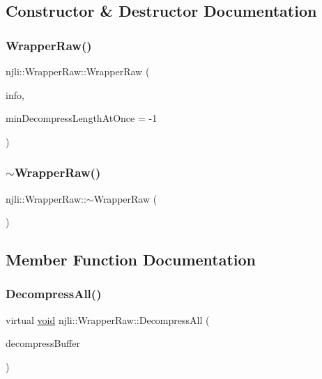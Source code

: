 \subsection{Constructor \& Destructor Documentation}
\mbox{\label{classnjli_1_1_wrapper_raw_ad512917755c10182cb00cb0f398e58ff}} 
\subsubsection{\texorpdfstring{Wrapper\+Raw()}{WrapperRaw()}}
{\footnotesize\ttfamily njli\+::\+Wrapper\+Raw\+::\+Wrapper\+Raw (\begin{DoxyParamCaption}\item[{Sound\+Info}]{info,  }\item[{int}]{min\+Decompress\+Length\+At\+Once = {\ttfamily -\/1} }\end{DoxyParamCaption})}

\mbox{\label{classnjli_1_1_wrapper_raw_a495e13205f68e27f66c6bcc3ff3ec0b2}} 
\subsubsection{\texorpdfstring{$\sim$\+Wrapper\+Raw()}{~WrapperRaw()}}
{\footnotesize\ttfamily njli\+::\+Wrapper\+Raw\+::$\sim$\+Wrapper\+Raw (\begin{DoxyParamCaption}{ }\end{DoxyParamCaption})}



\subsection{Member Function Documentation}
\mbox{\label{classnjli_1_1_wrapper_raw_aa3e0d88a80c5af562903e445ed2a863e}} 
\subsubsection{\texorpdfstring{Decompress\+All()}{DecompressAll()}}
{\footnotesize\ttfamily virtual \mbox{\hyperlink{_thread_8h_af1e856da2e658414cb2456cb6f7ebc66}{void}} njli\+::\+Wrapper\+Raw\+::\+Decompress\+All (\begin{DoxyParamCaption}\item[{std\+::vector$<$ char $>$ \&}]{decompress\+Buffer }\end{DoxyParamCaption})\hspace{0.3cm}{\ttfamily [virtual]}}



